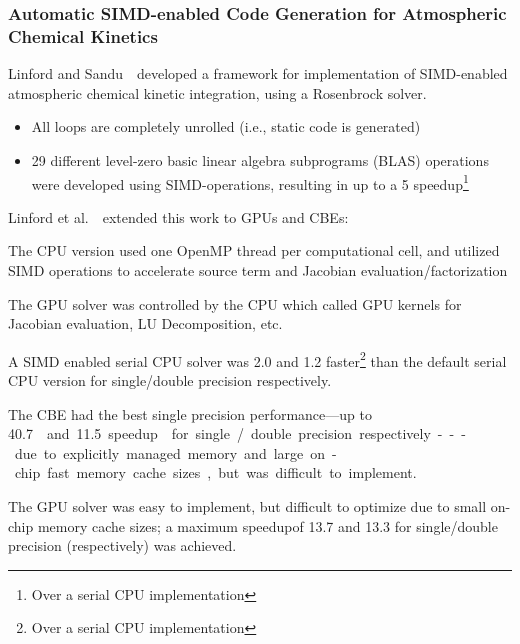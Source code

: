 \documentclass{beamer}
\begin{document}
\begin{frame}
 \frametitle{Automatic SIMD-enabled Code Generation for Atmospheric Chemical Kinetics}
 {
  Linford and Sandu~~developed a framework for implementation of SIMD-enabled atmospheric chemical kinetic integration, using a Rosenbrock solver.
 \begin{itemize}
  \item All loops are completely unrolled (i.e., static code is generated)
  \item 29 different level-zero basic linear algebra subprograms (BLAS) operations were developed using SIMD-operations, resulting in up to a \SI{5}{\times} speedup\footnote{Over a serial CPU implementation}
 \end{itemize}
 }
 Linford et al.~~extended this work to GPUs and CBEs:
 \begin{itemize}
  {
  \item The CPU version used one OpenMP thread per computational cell, and utilized SIMD operations to accelerate source term and Jacobian evaluation\slash factorization
  \item The GPU solver was controlled by the CPU which called GPU kernels for Jacobian evaluation, LU Decomposition, etc.
  }
  {
  \item<2-> A SIMD enabled serial CPU solver was \SI{2.0}{\times} and \SI{1.2}{\times} faster\footnote{Over a serial CPU implementation} than the default serial CPU version for single\slash double precision respectively.
  \item<2-> The CBE had the best single precision performance---up to \SI{40.7}\times and \SI{11.5}{\times} speedup\footnotemark[\value{footnote}] for single\slash double precision respectively---due to explicitly managed memory and large on-chip fast memory cache sizes, but was difficult to implement.
  \item<2-> The GPU solver was easy to implement, but difficult to optimize due to small on-chip memory cache sizes; a maximum speedup\footnotemark[\value{footnote}] of \SI{13.7}{\times} and \SI{13.3}{\times} for single\slash double precision (respectively) was achieved.
  }
 \end{itemize}
\end{frame}
\end{document}
